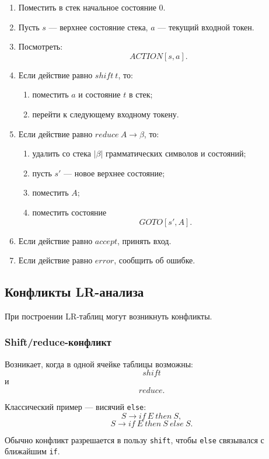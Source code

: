 \documentclass[12pt,a4paper]{article}
\theoremstyle{definition}
\theoremstyle{plain}
\begin{document}
\begin{enumerate}
    \item Поместить в стек начальное состояние $0$.
    \item Пусть $s$ --- верхнее состояние стека, $a$ --- текущий входной токен.
    \item Посмотреть:
    \[
    ACTION[s,a].
    \]
    \item Если действие равно $shift\ t$, то:
    \begin{enumerate}
        \item поместить $a$ и состояние $t$ в стек;
        \item перейти к следующему входному токену.
    \end{enumerate}
    \item Если действие равно $reduce\ A\to\beta$, то:
    \begin{enumerate}
        \item удалить со стека $|\beta|$ грамматических символов и состояний;
        \item пусть $s'$ --- новое верхнее состояние;
        \item поместить $A$;
        \item поместить состояние
        \[
        GOTO[s',A].
        \]
    \end{enumerate}
    \item Если действие равно $accept$, принять вход.
    \item Если действие равно $error$, сообщить об ошибке.
\end{enumerate}

\subsection{Конфликты LR-анализа}

При построении LR-таблиц могут возникнуть конфликты.

\subsubsection*{Shift/reduce-конфликт}

Возникает, когда в одной ячейке таблицы возможны:
\[
shift
\]
и
\[
reduce.
\]

Классический пример --- висячий \texttt{else}:
\[
S\to if\ E\ then\ S,
\]
\[
S\to if\ E\ then\ S\ else\ S.
\]

Обычно конфликт разрешается в пользу \texttt{shift}, чтобы \texttt{else} связывался с ближайшим \texttt{if}.
\end{document}
